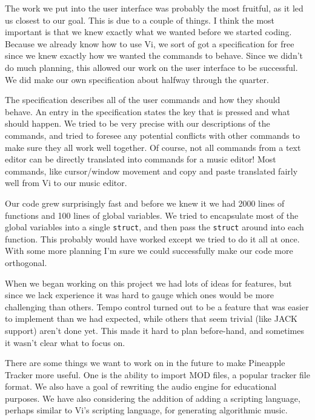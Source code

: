 \documentclass[12pt,letterpaper]{article}
\begin{document}

\par
The work we put into the user interface was probably the most fruitful, as it led us closest to our goal. This is due to a couple of things. I think the most important is that we knew exactly what we wanted before we started coding. Because we already know how to use Vi, we sort of got a specification for free since we knew exactly how we wanted the commands to behave. Since we didn't do much planning, this allowed our work on the user interface to be successful. We did make our own specification about halfway through the quarter.

\par
The specification describes all of the user commands and how they should behave. An entry in the specification states the key that is pressed and what should happen. We tried to be very precise with our descriptions of the commands, and tried to foresee any potential conflicts with other commands to make sure they all work well together. Of course, not all commands from a text editor can be directly translated into commands for a music editor! Most commands, like cursor/window movement and copy and paste translated fairly well from Vi to our music editor.

\par
Our code grew surprisingly fast and before we knew it we had 2000 lines of functions and 100 lines of global variables. We tried to encapsulate most of the global variables into a single \texttt{struct}, and then pass the \texttt{struct} around into each function. This probably would have worked except we tried to do it all at once. With some more planning I'm sure we could successfully make our code more orthogonal.

\par
When we began working on this project we had lots of ideas for features, but since we lack experience it was hard to gauge which ones would be more challenging than others. Tempo control turned out to be a feature that was easier to implement than we had expected, while others that seem trivial (like JACK support) aren't done yet. This made it hard to plan before-hand, and sometimes it wasn't clear what to focus on.

\par
There are some things we want to work on in the future to make Pineapple Tracker more useful. One is the ability to import MOD files, a popular tracker file format. We also have a goal of rewriting the audio engine for educational purposes. We have also considering the addition of adding a scripting language, perhaps similar to Vi's scripting language, for generating algorithmic music.
\end{document}
